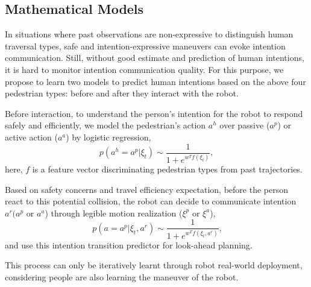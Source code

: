 \documentclass[conference]{IEEEtran}
\begin{document}
\subsection{Mathematical Models}
In situations where past observations are non-expressive to 
distinguish human traversal types, safe and 
intention-expressive maneuvers can evoke intention communication. Still, 
without good estimate and prediction of human intentions, it is hard to 
monitor intention communication quality. For this purpose, we propose to learn 
two models to predict human intentions based on the above four pedestrian 
types: before and after they interact with the robot.

Before interaction, to understand the person's intention for the robot to 
respond safely and efficiently, we model the pedestrian's action $a^h$ over 
passive ($a^p$) or active action ($a^a$) by logistic regression,
\begin{equation}
p(a^h=a^p|\xi_t) \sim \frac{1}{1+e^{w^Tf(\xi_t)}},
\end{equation}
here, $f$ is a feature vector discriminating pedestrian types from past trajectories.

Based on safety concerns and travel efficiency expectation, before the person 
react to this potential collision, the robot can 
decide to communicate intention $a^r (a^p$ or $a^a$) through legible motion 
realization ($\xi^p$ or $\xi^a$),
\begin{equation}~\label{eq:transition}
p(a=a^p|\xi_t, a^r) \sim \frac{1}{1+e^{w^Tf(\xi_t,a^r)}},
\end{equation}
and use this intention transition predictor for look-ahead planning.

This process can only be iteratively learnt through robot real-world 
deployment, considering people are also learning the maneuver of the robot.



\end{document}

